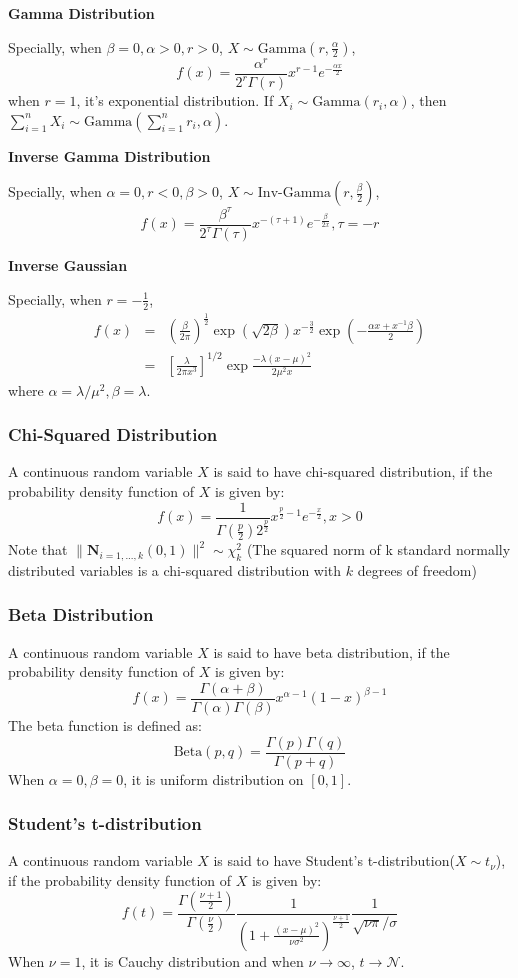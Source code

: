 \documentclass[11pt]{article}
\def\MN{{\mathcal N}}
\begin{document}
\textbf{Gamma Distribution}

Specially, when $\beta=0, \alpha>0, r>0$, $X\sim \mbox{Gamma}(r,\frac{\alpha}{2})$,
$$
f(x) = \frac{\alpha^r}{2^r\Gamma(r)} x^{r-1} e^{- \frac{\alpha x}{2} }
$$
when $r=1$, it's exponential distribution. If $X_i\sim  \mbox{Gamma}(r_i,\alpha)$, then $\sum_{i=1}^{n}X_i\sim \mbox{Gamma}({\sum_{i=1}^n{r_i},\alpha})$.

\textbf{Inverse Gamma Distribution}

Specially, when $\alpha=0, r<0, \beta>0$, $X\sim \mbox{Inv-Gamma}(r,\frac{\beta}{2})$,
$$
f(x) = \frac{\beta^\tau}{2^\tau\Gamma(\tau)} x^{-(\tau+1)} e^{- \frac{\beta}{2x} },\tau=-r
$$

\textbf{Inverse Gaussian}

Specially, when $r=-\frac{1}{2}$,
\begin{eqnarray*}
f(x) &=& \left(\frac{\beta}{2\pi}\right)^{\frac{1}{2}}\exp({\sqrt{2\beta}})x^{-\frac{3}{2}}\exp(-\frac{\alpha x+x^{-1}\beta}{2})\\
&=& \left[\frac{\lambda}{2 \pi x^3}\right]^{1/2} \exp{\frac{-\lambda (x-\mu)^2}{2 \mu^2 x}} 
\end{eqnarray*}
where $\alpha = \lambda/\mu^2, \beta = \lambda$.

\subsubsection{Chi-Squared Distribution}
A continuous random variable $X$ is said to have chi-squared distribution, if the probability density function of $X$ is given by:
\[f(x) = \frac{1}{\Gamma(\frac{p}{2})2^{\frac{p}{2}}} x^{\frac{p}{2} - 1} e^{-\frac{x}{2}}, x>0\]
Note that $\|\boldsymbol{N}_{i=1,...,k}{(0,1)}\|^2 \sim \chi^2_k$ (The squared norm of k standard normally distributed variables is a chi-squared distribution with $k$ degrees of freedom)

\subsubsection{Beta Distribution}
A continuous random variable $X$ is said to have beta distribution, if the probability density function of $X$ is given by:
\[f(x) = \frac{\Gamma(\alpha + \beta)}{\Gamma(\alpha)\Gamma(\beta)} x^{\alpha - 1} (1-x)^{\beta - 1}\]
The beta function is defined as:
$$
\mbox{Beta}(p,q)=\frac{\Gamma(p)\Gamma(q)}{\Gamma(p+q)}
$$
When $\alpha=0,\beta=0$, it is uniform distribution on $[0,1]$.

\subsubsection{Student's t-distribution}
A continuous random variable $X$ is said to have Student's t-distribution($X\sim t_\nu$), if the probability density function of $X$ is given by:
$$
f(t) = \frac{\Gamma(\frac{\nu+1}{2})}{\Gamma(\frac{\nu}{2})} \frac{1}{\left(1+\frac{(x-\mu)^2}{\nu\sigma^2}\right)^{\frac{\nu+1}{2}}} \frac{1}{\sqrt{\nu\pi}/\sigma}
$$
When $\nu=1$, it is Cauchy distribution and when $\nu\rightarrow\infty$, $t\rightarrow\MN$.
\end{document}
